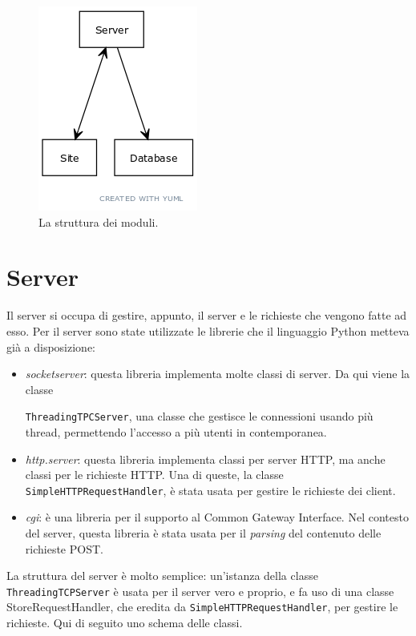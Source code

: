 \documentclass[a4paper,12pt]{report}
\begin{document}
\begin{figure}[h]
\centering{}
\includegraphics[]{uml1.png}
\caption{La struttura dei moduli.}
\label{img:uml_modules}
\end{figure}

\section{Server}

Il server si occupa di gestire, appunto, il server e le richieste che vengono fatte ad esso. Per il server sono state utilizzate le librerie che il linguaggio Python metteva già a disposizione:
\begin{itemize}
\item \textit{socketserver}: questa libreria implementa molte classi di server. Da qui viene la classe

\texttt{ThreadingTPCServer}, una classe che gestisce le connessioni usando più thread, permettendo l'accesso a più utenti in contemporanea.
\item \textit{http.server}: questa libreria implementa classi per server HTTP, ma anche classi per le richieste HTTP. Una di queste, la classe \texttt{SimpleHTTPRequestHandler}, è stata usata per gestire le richieste dei client.
\item \textit{cgi}: è una libreria per il supporto al Common Gateway Interface. Nel contesto del server, questa libreria è stata usata per il \textit{parsing} del contenuto delle richieste POST.
\end{itemize}

La struttura del server è molto semplice: un'istanza della classe \texttt{ThreadingTCPServer} è usata per il server vero e proprio, e fa uso di una classe StoreRequestHandler, che eredita da \texttt{SimpleHTTPRequestHandler}, per gestire le richieste. Qui di seguito uno schema delle classi.
\end{document}
